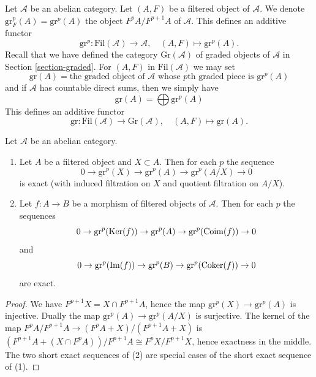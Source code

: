 \noindent
Let $\mathcal{A}$ be an abelian category. Let $(A, F)$ be a filtered
object of $\mathcal{A}$. We denote $\text{gr}^p_F(A) = \text{gr}^p(A)$
the object $F^pA/F^{p + 1}A$ of $\mathcal{A}$. This defines an
additive functor
$$
\text{gr}^p :
\text{Fil}(\mathcal{A})
\longrightarrow
\mathcal{A}, \quad
(A, F)
\longmapsto
\text{gr}^p(A).
$$
Recall that we have defined the category $\text{Gr}(\mathcal{A})$
of graded objects of $\mathcal{A}$ in Section \ref{section-graded}.
For $(A, F)$ in $\text{Fil}(\mathcal{A})$ we may set
$$
\text{gr}(A) = \text{the graded object of }\mathcal{A}\text{ whose }
p\text{th graded piece is }\text{gr}^p(A)
$$
and if $\mathcal{A}$ has countable direct sums, then we simply have
$$
\text{gr}(A) = \bigoplus \text{gr}^p(A)
$$
This defines an additive functor
$$
\text{gr} :
\text{Fil}(\mathcal{A})
\longrightarrow
\text{Gr}(\mathcal{A}), \quad
(A, F) \longmapsto \text{gr}(A).
$$

\begin{lemma}
\label{lemma-ses-gr}
Let $\mathcal{A}$ be an abelian category.
\begin{enumerate}
\item Let $A$ be a filtered object and $X \subset A$. Then for each $p$
the sequence
$$
0 \to \text{gr}^p(X) \to \text{gr}^p(A) \to \text{gr}^p(A/X) \to 0
$$
is exact (with induced filtration on $X$ and quotient filtration on $A/X$).
\item Let $f : A \to B$ be a morphism of filtered objects of $\mathcal{A}$.
Then for each $p$ the sequences
$$
0 \to \text{gr}^p(\mathop{\mathrm{Ker}}(f)) \to \text{gr}^p(A) \to
\text{gr}^p(\mathop{\mathrm{Coim}}(f)) \to 0
$$
and
$$
0 \to \text{gr}^p(\mathop{\mathrm{Im}}(f)) \to \text{gr}^p(B) \to
\text{gr}^p(\mathop{\mathrm{Coker}}(f)) \to 0
$$
are exact.
\end{enumerate}
\end{lemma}

\begin{proof}
We have $F^{p + 1}X = X \cap F^{p + 1}A$, hence the map
$\text{gr}^p(X) \to \text{gr}^p(A)$ is injective. Dually the map
$\text{gr}^p(A) \to \text{gr}^p(A/X)$ is surjective.
The kernel of the map $F^pA/F^{p + 1}A \to (F^pA + X)/(F^{p + 1}A + X)$
is $(F^{p + 1}A + (X \cap F^pA))/F^{p + 1}A \cong F^pX/F^{p + 1}X$,
hence exactness in the middle.
The two short exact sequences of (2) are special cases of the
short exact sequence of (1).
\end{proof}

